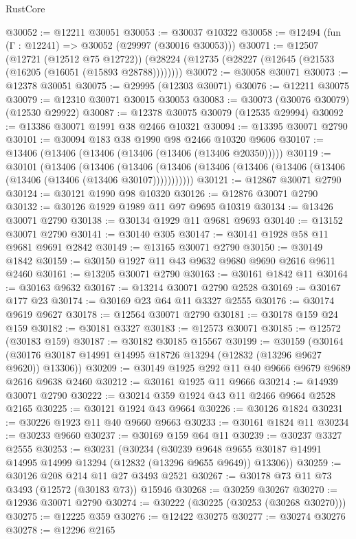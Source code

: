\begin{lexlean}{RustCore}
\begin{coremodule}
@30052 := @12211 @30051
@30053 := @30037 @10322
@30058 := @12494 (fun (Γ : @12241) => @30052 (@29997 (@30016 @30053)))
@30071 := @12507
    (@12721 (@12512 @75 @12722))
    (@28224 (@12735 (@28227 (@12645 (@21533 (@16205 (@16051 (@15893 @28788))))))))
@30072 := @30058 @30071
@30073 := @12378 @30051
@30075 := @29995 (@12303 @30071)
@30076 := @12211 @30075
@30079 := @12310 @30071 @30015 @30053
@30083 := @30073 (@30076 @30079) (@12530 @29922)
@30087 := @12378 @30075 @30079 (@12535 @29994)
@30092 := @13386 @30071 @1991 @38 @2466 @10321
@30094 := @13395 @30071 @2790
@30101 := @30094 @183 @38 @1990 @98 @2466 @10320 @9606
@30107 := @13406 (@13406 (@13406 (@13406 (@13406 (@13406 @20350)))))
@30119 := @30101
    (@13406
      (@13406
        (@13406 (@13406 (@13406 (@13406 (@13406 (@13406 (@13406 (@13406 (@13406 @30107)))))))))))
@30121 := @12867 @30071 @2790
@30124 := @30121 @1990 @98 @10320
@30126 := @12876 @30071 @2790
@30132 := @30126 @1929 @1989 @11 @97 @9695 @10319
@30134 := @13426 @30071 @2790
@30138 := @30134 @1929 @11 @9681 @9693
@30140 := @13152 @30071 @2790
@30141 := @30140 @305
@30147 := @30141 @1928 @58 @11 @9681 @9691 @2842
@30149 := @13165 @30071 @2790
@30150 := @30149 @1842
@30159 := @30150 @1927 @11 @43 @9632 @9680 @9690 @2616 @9611 @2460
@30161 := @13205 @30071 @2790
@30163 := @30161 @1842 @11
@30164 := @30163 @9632
@30167 := @13214 @30071 @2790 @2528
@30169 := @30167 @177 @23
@30174 := @30169 @23 @64 @11 @3327 @2555
@30176 := @30174 @9619 @9627
@30178 := @12564 @30071 @2790
@30181 := @30178 @159 @24 @159
@30182 := @30181 @3327
@30183 := @12573 @30071
@30185 := @12572 (@30183 @159)
@30187 := @30182 @30185 @15567
@30199 := @30159
    (@30164 (@30176 @30187 @14991 @14995 @18726 @13294 (@12832 (@13296 @9627 @9620)) @13306))
@30209 := @30149 @1925 @292 @11 @40 @9666 @9679 @9689 @2616 @9638 @2460
@30212 := @30161 @1925 @11 @9666
@30214 := @14939 @30071 @2790
@30222 := @30214 @359 @1924 @43 @11 @2466 @9664 @2528 @2165
@30225 := @30121 @1924 @43 @9664
@30226 := @30126 @1824
@30231 := @30226 @1923 @11 @40 @9660 @9663
@30233 := @30161 @1824 @11
@30234 := @30233 @9660
@30237 := @30169 @159 @64 @11
@30239 := @30237 @3327 @2555
@30253 := @30231
    (@30234
      (@30239 @9648 @9655 @30187 @14991 @14995 @14999 @13294 (@12832 (@13296 @9655 @9649)) @13306))
@30259 := @30126 @208 @214 @11 @27 @3493 @2521
@30267 := @30178 @73 @11 @73 @3493 (@12572 (@30183 @73)) @15946
@30268 := @30259 @30267
@30270 := @12936 @30071 @2790
@30274 := @30222 (@30225 (@30253 (@30268 @30270)))
@30275 := @12225 @359
@30276 := @12422 @30275
@30277 := @30274 @30276
@30278 := @12296 @2165

\end{coremodule}
\end{lexlean}
